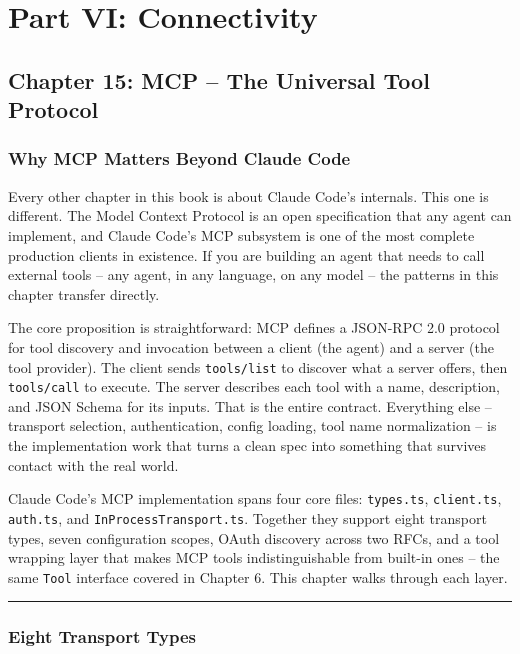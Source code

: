 \documentclass[
  english,
  11pt,
  letterpaper,
]{book}
\begin{document}
\part{Part VI: Connectivity}

\chapter{Chapter 15: MCP -- The Universal Tool
Protocol}\label{chapter-15-mcp-the-universal-tool-protocol}

\section{Why MCP Matters Beyond Claude
Code}\label{why-mcp-matters-beyond-claude-code}

Every other chapter in this book is about Claude Code's internals. This
one is different. The Model Context Protocol is an open specification
that any agent can implement, and Claude Code's MCP subsystem is one of
the most complete production clients in existence. If you are building
an agent that needs to call external tools -- any agent, in any
language, on any model -- the patterns in this chapter transfer
directly.

The core proposition is straightforward: MCP defines a JSON-RPC 2.0
protocol for tool discovery and invocation between a client (the agent)
and a server (the tool provider). The client sends \texttt{tools/list}
to discover what a server offers, then \texttt{tools/call} to execute.
The server describes each tool with a name, description, and JSON Schema
for its inputs. That is the entire contract. Everything else --
transport selection, authentication, config loading, tool name
normalization -- is the implementation work that turns a clean spec into
something that survives contact with the real world.

Claude Code's MCP implementation spans four core files:
\texttt{types.ts}, \texttt{client.ts}, \texttt{auth.ts}, and
\texttt{InProcessTransport.ts}. Together they support eight transport
types, seven configuration scopes, OAuth discovery across two RFCs, and
a tool wrapping layer that makes MCP tools indistinguishable from
built-in ones -- the same \texttt{Tool} interface covered in Chapter 6.
This chapter walks through each layer.

\begin{center}\rule{0.5\linewidth}{0.5pt}\end{center}

\section{Eight Transport Types}\label{eight-transport-types}
\end{document}
